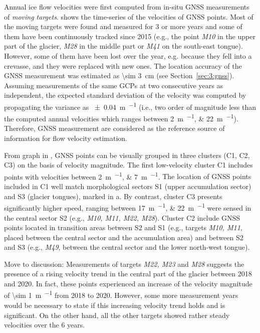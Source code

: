 Annual ice flow velocities were first computed from in-situ GNSS measurements of \textit{moving targets}.
 shows the time-series of the velocities of GNSS points. 
Most of the moving targets were found and measured for 3 or more years and some of them have been continuously tracked since 2015 (e.g., the point \textit{M10} in the upper part of the glacier, \textit{M28} in the middle part or \textit{M41} on the south-east tongue). 
However, some of them have been lost over the year, e.g. because they fell into a crevasse, and they were replaced with new ones. 
The location accuracy of the GNSS measurement was estimated as \qty{\sim 3}{\centi\meter} (see Section~\ref{sec:3:gnss}). 
Assuming measurements of the same GCPs at two consecutive years as independent,
the expected standard deviation of the velocity was computed by propagating the variance as \qty{\pm 0.04}{\meter\per\year} (i.e., two order of magnitude less than the computed annual velocities which ranges between \qtylist{2;22}{\meter\per\year}).
Therefore, GNSS measurement are considered as the reference source of information for flow velocity estimation.

From graph in , GNSS points can be visually grouped in three clusters (C1, C2, C3) on the basis of velocity magnitude. 
The first low-velocity cluster C1 includes points with velocities between  \qtylist{2;7}{\meter\per\year}. 
{\color{red}
The location of GNSS points included in C1 well match morphological sectors S1 (upper accumulation sector) and S3 (glacier tongues), marked in a.
By contrast, cluster C3 presents significantly higher speed, ranging between \qtylist{17;22}{\meter\per\year} were sensed in the central sector S2 (e.g., \textit{M10, M11, M22, M28}).
Cluster C2 include GNSS points located in transition areas between S2 and S1 (e.g., targets \textit{M10, M11}, placed between the central sector and the accumulation area) and between S2 and S3 (e.g., \textit{M49}, between the central sector and the lower north-west tongue).
}

{\color{red} Move to discussion: 
Measurements of targets \textit{M22, M23} and \textit{M28} suggests the presence of a rising velocity trend in the central part of the glacier between 2018 and 2020. 
In fact, these points experienced an increase of the velocity magnitude of \qty{\sim 1}{\meter\per\year} from 2018 to 2020.
However, some more measurement years would be necessary to state if this increasing velocity trend holds and is significant. 
On the other hand, all the other targets showed rather steady velocities over the 6 years.
}

